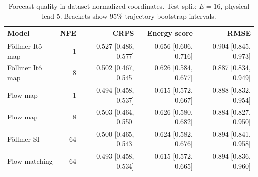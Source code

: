 \begin{table}[t]
\centering
\small
\setlength{\tabcolsep}{3pt}
\caption{Forecast quality in dataset normalized coordinates. Test split; $E=16$, physical lead 5. Brackets show 95\% trajectory-bootstrap intervals.}
\label{tab:map-quality}
\begin{tabular}{lrrrr}
\toprule
Model & NFE & CRPS & Energy score & RMSE \\
\midrule
Föllmer Itô map & 1 & 0.527 [0.486, 0.577] & 0.656 [0.606, 0.716] & 0.904 [0.845, 0.973] \\
Föllmer Itô map & 8 & 0.502 [0.467, 0.545] & 0.626 [0.584, 0.677] & 0.887 [0.834, 0.949] \\
\addlinespace
Flow map & 1 & 0.494 [0.458, 0.537] & 0.615 [0.572, 0.667] & 0.888 [0.832, 0.954] \\
Flow map & 8 & 0.503 [0.464, 0.550] & 0.626 [0.580, 0.682] & 0.884 [0.827, 0.950] \\
\addlinespace
Föllmer SI & 64 & 0.500 [0.465, 0.543] & 0.624 [0.582, 0.676] & 0.894 [0.841, 0.958] \\
\addlinespace
Flow matching & 64 & 0.493 [0.458, 0.534] & 0.615 [0.572, 0.665] & 0.894 [0.836, 0.960] \\
\bottomrule
\end{tabular}
\end{table}
